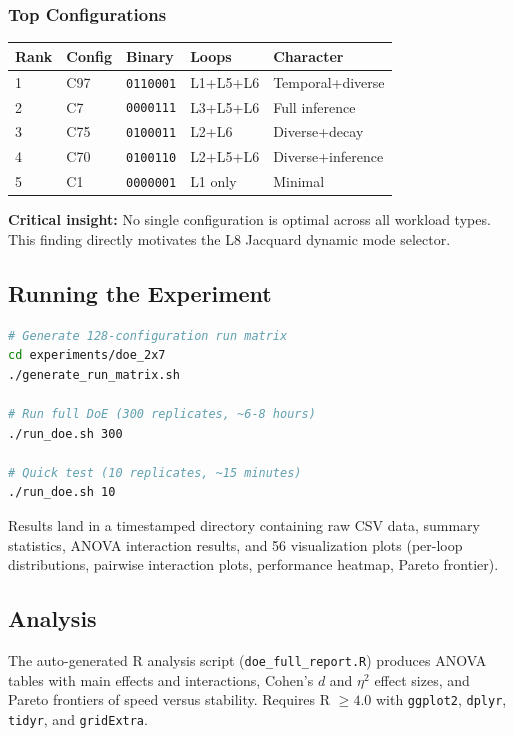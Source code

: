 \subsubsection{Top Configurations}

\begin{center}
\begin{tabular}{lllll}
\toprule
Rank & Config & Binary & Loops & Character \\
\midrule
1 & C97  & \texttt{0110001} & L1+L5+L6 & Temporal+diverse \\
2 & C7   & \texttt{0000111} & L3+L5+L6 & Full inference \\
3 & C75  & \texttt{0100011} & L2+L6    & Diverse+decay \\
4 & C70  & \texttt{0100110} & L2+L5+L6 & Diverse+inference \\
5 & C1   & \texttt{0000001} & L1 only  & Minimal \\
\bottomrule
\end{tabular}
\end{center}

\textbf{Critical insight:} No single configuration is optimal across all
workload types. This finding directly motivates the L8 Jacquard dynamic
mode selector.

\subsection{Running the Experiment}

\begin{lstlisting}[language=bash]
# Generate 128-configuration run matrix
cd experiments/doe_2x7
./generate_run_matrix.sh

# Run full DoE (300 replicates, ~6-8 hours)
./run_doe.sh 300

# Quick test (10 replicates, ~15 minutes)
./run_doe.sh 10
\end{lstlisting}

Results land in a timestamped directory containing raw CSV data, summary
statistics, ANOVA interaction results, and 56 visualization plots
(per-loop distributions, pairwise interaction plots, performance heatmap,
Pareto frontier).

\subsection{Analysis}

The auto-generated R analysis script (\texttt{doe\_full\_report.R})
produces ANOVA tables with main effects and interactions, Cohen's $d$ and
$\eta^2$ effect sizes, and Pareto frontiers of speed versus stability.
Requires R $\geq 4.0$ with \texttt{ggplot2}, \texttt{dplyr},
\texttt{tidyr}, and \texttt{gridExtra}.

